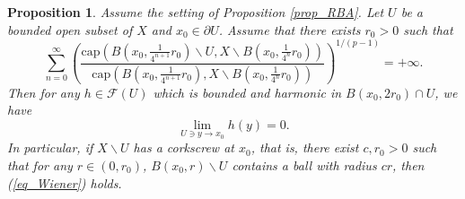\documentclass[11pt,a4paper]{article}
\numberwithin{equation}{section}
\theoremstyle{plain}
\newtheorem{proposition}[theorem]{Proposition}
\theoremstyle{definition}
\begin{document}
\begin{proposition}\label{prop_Wiener}
Assume the setting of Proposition \ref{prop_RBA}. Let $U$ be a bounded open subset of $X$ and $x_0\in \partial U$. Assume that there exists $r_0>0$ such that
\begin{equation}\label{eq_Wiener}
\sum_{n=0}^\infty \left(\frac{\mathrm{cap}\left(B(x_0,\frac{1}{4^{n+1}}r_0)\backslash U,X\backslash B(x_0,\frac{1}{4^{n}}r_0)\right)}{\mathrm{cap}\left(B(x_0,\frac{1}{4^{n+1}}r_0),X\backslash B(x_0,\frac{1}{4^{n}}r_0)\right)}\right)^{1/(p-1)}=+\infty.
\end{equation}
Then for any $h\in \mathcal{F}(U)$ which is bounded and harmonic in $B(x_0,2r_0)\cap U$, we have
$$\lim_{U\ni y\to x_0}h(y)=0.$$
In particular, if $X\backslash U$ has a corkscrew at $x_0$, that is, there exist $c, r_0>0$ such that for any $r\in(0,r_0)$, $B(x_0,r)\backslash U$ contains a ball with radius $cr$, then (\ref{eq_Wiener}) holds.
\end{proposition}
\end{document}
